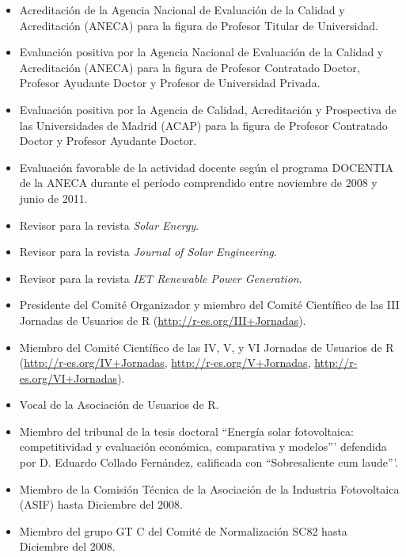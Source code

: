 \documentclass[article, a4paper]{memoir}
\begin{document}
\begin{itemize}
\item Acreditación de la Agencia Nacional de Evaluación de la Calidad y
Acreditación (ANECA) para la figura de Profesor Titular de
Universidad.

\item Evaluación positiva por la Agencia Nacional de Evaluación de la
Calidad y Acreditación (ANECA) para la figura de Profesor Contratado
Doctor, Profesor Ayudante Doctor y Profesor de Universidad Privada.

\item Evaluación positiva por la Agencia de Calidad, Acreditación y
Prospectiva de las Universidades de Madrid (ACAP) para la figura de
Profesor Contratado Doctor y Profesor Ayudante Doctor.

\item Evaluación favorable de la actividad docente según el programa
DOCENTIA de la ANECA durante el período comprendido entre noviembre
de 2008 y junio de 2011.

\item Revisor para la revista \emph{Solar Energy}.

\item Revisor para la revista \emph{Journal of Solar Engineering}.

\item Revisor para la revista \emph{IET Renewable Power Generation}.

\item Presidente del Comité Organizador y miembro del Comité Científico de
las III Jornadas de Usuarios de R (\url{http://r-es.org/III+Jornadas}).

\item Miembro del Comité Científico de las IV, V, y VI Jornadas de
Usuarios de R (\url{http://r-es.org/IV+Jornadas},
\url{http://r-es.org/V+Jornadas}, \url{http://r-es.org/VI+Jornadas}).

\item Vocal de la Asociación de Usuarios de R.

\item Miembro del tribunal de la tesis doctoral ``Energía solar
fotovoltaica: competitividad y evaluación económica,
comparativa y modelos''' defendida por D. Eduardo Collado
Fernández, calificada con ``Sobresaliente cum laude'''.

\item Miembro de la Comisión Técnica de la Asociación de la Industria
Fotovoltaica (ASIF) hasta Diciembre del 2008.

\item Miembro del grupo GT C del Comité de Normalización SC82 hasta
Diciembre del 2008.
\end{itemize}
\end{document}
